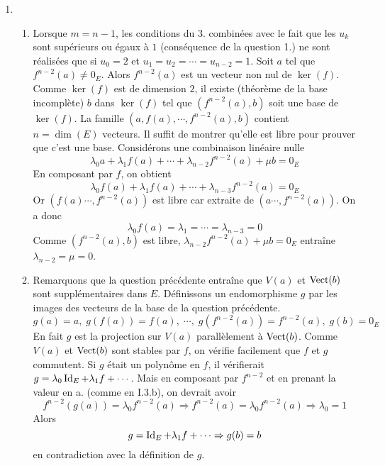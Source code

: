 \begin{enumerate}
 \item
\begin{enumerate}
 \item Lorsque $m=n-1$, les conditions du 3. combinées avec le fait que les $u_k$ sont supérieurs ou égaux à $1$ (conséquence de la question 1.) ne sont réalisées que si $u_0=2$ et $u_1=u_2=\cdots=u_{n-2}=1$.\newline
Soit $a$ tel que $f^{n-2}(a)\neq 0_E$. Alors $f^{n-2}(a)$ est un vecteur non nul de $\ker(f)$. Comme $\ker(f)$ est de dimension $2$, il existe (théorème de la base incomplète) $b$ dans $\ker(f)$ tel que $(f^{n-2}(a),b)$ soit une base de $\ker(f)$.\newline
La famille $(a,f(a),\cdots,f^{n-2}(a),b)$ contient $n=\dim(E)$ vecteurs. Il suffit de montrer qu'elle est libre pour prouver que c'est une base. Considérons une combinaison linéaire nulle
\begin{displaymath}
 \lambda_0 a + \lambda_1 f(a) + \cdots + \lambda_{n-2}f^{n-2}(a) + \mu b=0_E
\end{displaymath}
En composant par $f$, on obtient
\begin{displaymath}
 \lambda_0 f(a) + \lambda_1 f(a) + \cdots + \lambda_{n-3}f^{n-2}(a)=0_E
\end{displaymath}
Or $(f(a)\cdots,f^{n-2}(a))$ est libre car extraite de $(a\cdots,f^{n-2}(a))$. On a donc
\begin{displaymath}
 \lambda_0 f(a) = \lambda_1 = \cdots = \lambda_{n-3}=0
\end{displaymath}
 Comme $(f^{n-2}(a),b)$ est libre, $\lambda_{n-2}f^{n-2}(a) + \mu b=0_E$ entraîne $\lambda_{n-2}= \mu=0$.
 \item Remarquons que la question précédente entraîne que $V(a)$ et $\operatorname{Vect}(b)$ sont supplémentaires dans $E$. Définissons un endomorphisme $g$ par les images des vecteurs de la base de la question précédente.
\begin{displaymath}
 g(a)=a,\; g(f(a))=f(a),\; \cdots ,\;g(f^{n-2}(a))=f^{n-2}(a),\; g(b)=0_E
\end{displaymath}
En fait $g$ est la projection sur $V(a)$ parallèlement à $\operatorname{Vect}(b)$. Comme $V(a)$ et $\operatorname{Vect}(b)$ sont stables par $f$, on vérifie facilement que $f$ et $g$ commutent.\newline
Si $g$ était un polynôme en $f$, il vérifierait $g=\lambda_0 \operatorname{Id}_E +\lambda_1 f+\cdots$. Mais en composant par $f^{n-2}$ et en prenant la valeur en a. (comme en I.3.b), on devrait avoir
\begin{displaymath}
 f^{n-2}(g(a))=\lambda_0 f^{n-2}(a)\Rightarrow f^{n-2}(a)=\lambda_0 f^{n-2}(a)\Rightarrow \lambda_0 = 1
\end{displaymath}
Alors
\begin{displaymath}
 g= \operatorname{Id}_E +\lambda_1 f+\cdots \Rightarrow g(b) = b
\end{displaymath}
en contradiction avec la définition de $g$.
\end{enumerate}


\end{enumerate}
